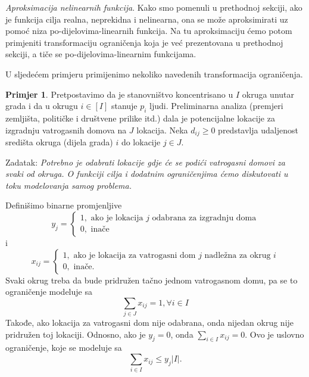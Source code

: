 \documentclass[b5paper, utf8, 11pt, colorlinks]{book}
\theoremstyle{definition}
\newtheorem{primjer}{Primjer}[chapter]
\begin{document}

\emph{Aproksimacija nelinearnih funkcija}. Kako smo pomenuli u prethodnoj sekciji, ako je funkcija cilja realna, neprekidna i nelinearna, ona se može aproksimirati uz pomoć  niza po-dijelovima-linearnih funkcija. Na tu aproksimaciju ćemo potom primjeniti transformaciju ograničenja koja je već prezentovana u prethodnoj sekciji, a tiče se po-dijelovima-linearnim funkcijama. 

U sljedećem primjeru primijenimo nekoliko navedenih transformacija ograničenja.


\begin{primjer} Pretpostavimo da je stanovništvo koncentrisano u $I$ okruga  unutar grada i da u okrugu $i\in [I]$ stanuje $p_i$ ljudi. Preliminarna analiza (premjeri zemljišta, političke i društvene prilike itd.) dala je potencijalne lokacije za izgradnju vatrogasnih domova na $J$ lokacija. Neka $d_{ij} \geq 0$ predstavlja udaljenost   središta okruga (dijela grada) $i$  do lokacije $j \in J $. 
\end{primjer}
Zadatak: \emph{Potrebno je odabrati lokacije gdje će se podići vatrogasni domovi za svaki od okruga. O funkciji cilja i dodatnim ograničenjima ćemo diskutovati u toku modelovanja samog problema.}

Definišimo binarne promjenljive 
$$y_j = \begin{cases}
	1, \mbox{ ako je lokacija } j \mbox{ odabrana za izgradnju doma} \\
	0, \mbox{ inače}
\end{cases}$$
i 
$$
x_{ij}= \begin{cases}
	1, \mbox{ ako je lokacija za vatrogasni dom } j \mbox{ nadležna za okrug } i \\
	0, \mbox{ inače}. 
\end{cases}
$$
Svaki okrug treba da bude pridružen tačno jednom vatrogasnom domu, pa se to ograničenje modeluje sa
\begin{equation}\label{eq:ex-constr-1}
	\sum_{j \in J} x_{ij} = 1, \forall i \in I
\end{equation}
Takođe, ako lokacija za vatrogasni dom nije odabrana, onda nijedan okrug nije pridružen toj lokaciji. Odnosno, ako je $y_j = 0$, onda $ \sum_{i \in I} x_{ij} = 0$. Ovo je uslovno ograničenje, koje se modeluje sa
\begin{equation}\label{eq:ex-constr-2}
	\sum_{i \in I} x_{ij} \leq y_j |I|.
\end{equation}
\end{document}

